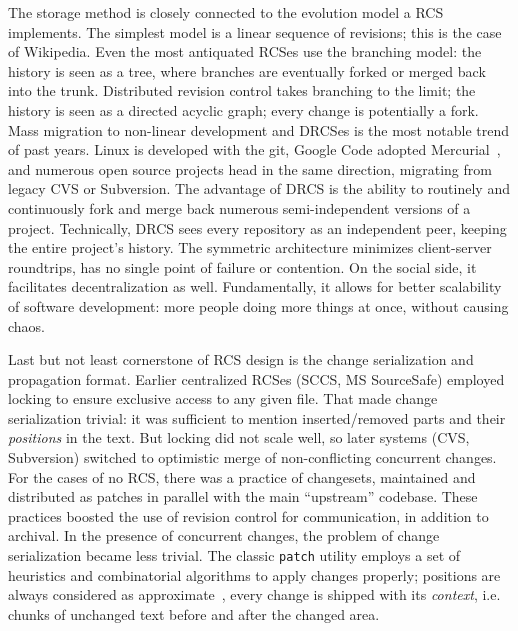 \documentclass{sig-alternate}
\begin{document}
The storage method is closely connected to the evolution model a RCS implements.
The simplest model is a linear sequence of revisions; this is the case of Wikipedia.
Even the most antiquated RCSes use the branching model: the history is seen as a tree, where branches are eventually forked or merged back into the trunk.
Distributed revision control takes branching to the limit; the history is seen as a directed acyclic graph; every change is potentially a fork.
Mass migration to non-linear development and DRCSes is the most notable trend of past years.
Linux is developed with the git, Google Code adopted Mercurial~\cite{mercurial}, and numerous open source projects head in the same direction, migrating from legacy CVS or Subversion.
The advantage of DRCS is the ability to routinely and continuously fork and merge back numerous semi-independent versions of a project.
Technically, DRCS sees every repository as an independent peer, keeping the entire project's history. The symmetric architecture minimizes client-server roundtrips, has no single point of failure or contention.
On the social side, it facilitates decentralization as well.
Fundamentally, it allows for better scalability of software development: more people doing more things at once, without causing chaos.

Last but not least cornerstone of RCS design is the change serialization and propagation format.
Earlier centralized RCSes (SCCS, MS SourceSafe) employed locking to ensure exclusive access to any given file.
That made change serialization trivial: it was sufficient to mention inserted/removed parts and their \emph{positions} in the text.
But locking did not scale well, so later systems (CVS, Subversion) switched to optimistic merge of non-conflicting concurrent changes.
For the cases of no RCS, there was a practice of changesets, maintained and distributed as patches \cite{stdpatch} in parallel with the main ``upstream'' codebase.
These practices boosted the use of revision control for communication, in addition to archival. 
In the presence of concurrent changes, the problem of change serialization became less trivial.
The classic \verb+patch+ utility employs a set of heuristics and combinatorial algorithms to apply changes properly; positions are always considered as approximate~\cite{patch,fraser}, every change is shipped with its \emph{context}, i.e. chunks of unchanged text before and after the changed area.
\end{document}

